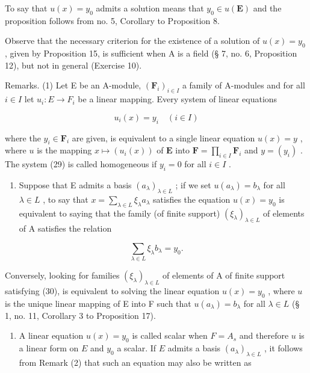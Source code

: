 To say that \(u(x) = y_{0}\) admits a solution means that \(y_{0} \in u(\mathbf{E})\) and the proposition follows from no. 5, Corollary to Proposition 8.

Observe that the necessary criterion for the existence of a solution of \(u(x) = y_{0}\) , given by Proposition 15, is sufficient when A is a field (§ 7, no. 6, Proposition 12), but not in general (Exercise 10).

Remarks. (1) Let E be an A-module, \((\mathbf{F}_{i})_{i\in I}\) a family of A-modules and for all \(i\in I\) let \(u_{i}:E\to F_{i}\) be a linear mapping. Every system of linear equations

\[
u _ {i} (x) = y _ {i} \quad (i \in I)\tag{29}
\]

where the \(y_{i} \in \mathbf{F}_{i}\) are given, is equivalent to a single linear equation \(u(x) = y\) , where \(u\) is the mapping \(x \mapsto (u_{i}(x))\) of \(\mathbf{E}\) into \(\mathbf{F} = \prod_{i \in I} \mathbf{F}_{i}\) and \(y = (y_{i})\) . The system (29) is called homogeneous if \(y_{i} = 0\) for all \(i \in I\) .

\begin{enumerate}
\def\labelenumi{(\arabic{enumi})}
\setcounter{enumi}{1}
\tightlist
\item
  Suppose that E admits a basis \((a_{\lambda})_{\lambda \in L}\) ; if we set \(u(a_{\lambda}) = b_{\lambda}\) for all \(\lambda \in L\) , to say that \(x = \sum_{\lambda \in L} \xi_{\lambda} a_{\lambda}\) satisfies the equation \(u(x) = y_0\) is equivalent to saying that the family (of finite support) \((\xi_{\lambda})_{\lambda \in L}\) of elements of A satisfies the relation
\end{enumerate}

\[
\sum_ {\lambda \in L} \xi_ {\lambda} b _ {\lambda} = y _ {0}.\tag{30}
\]

Conversely, looking for families \((\xi_{\lambda})_{\lambda \in L}\) of elements of A of finite support satisfying (30), is equivalent to solving the linear equation \(u(x) = y_0\) , where \(u\) is the unique linear mapping of E into F such that \(u(a_{\lambda}) = b_{\lambda}\) for all \(\lambda \in L\) (§ 1, no. 11, Corollary 3 to Proposition 17).

\begin{enumerate}
\def\labelenumi{(\arabic{enumi})}
\setcounter{enumi}{2}
\tightlist
\item
  A linear equation \(u(x) = y_0\) is called scalar when \(F = A_s\) and therefore \(u\) is a linear form on \(E\) and \(y_0\) a scalar. If \(E\) admits a basis \((a_\lambda)_{\lambda \in L}\) , it follows from Remark (2) that such an equation may also be written as
\end{enumerate}

